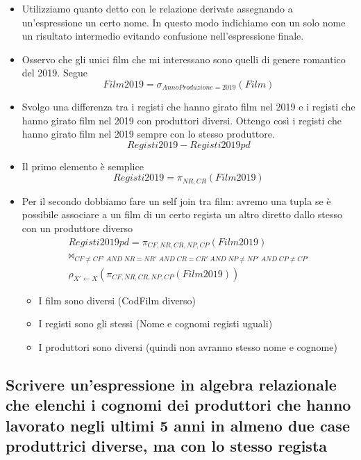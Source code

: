 \begin{itemize}
	\item Utilizziamo quanto detto con le relazione derivate assegnando a un'espressione un certo nome. In questo modo indichiamo con un solo nome un risultato intermedio evitando confusione nell'espressione finale.
	\item Osservo che gli unici film che mi interessano sono quelli di genere romantico del 2019. Segue
	\[Film2019 = \sigma_{AnnoProduzione = 2019}(Film)\]
	\item Svolgo una differenza tra i registi che hanno girato film nel 2019 e i registi che hanno girato film nel 2019 con produttori diversi. Ottengo così i registi che hanno girato film nel 2019 sempre con lo stesso produttore.
	\[Registi2019 - Registi2019pd\]
	\item Il primo elemento è semplice
	\[Registi2019 = \pi_{NR,CR}(Film2019)\]
	\item Per il secondo dobbiamo fare un self join tra film: avremo una tupla se è possibile associare a un film di un certo regista un altro diretto dallo stesso con un produttore diverso
	\begin{align*}Registi2019pd = \pi_{CF,NR,CR,NP,CP}(Film2019)\\ \Join_{CF \neq CF'\;AND\;NR=NR'\;AND\;CR=CR'\;AND\;NP\neq NP'\;AND\;CP\neq CP'} \\\rho_{X' \longleftarrow X}(\pi_{CF,NR,CR,NP,CP}(Film2019))\end{align*}
	\begin{itemize}
		\item I film sono diversi (CodFilm diverso)
		\item I registi sono gli stessi (Nome e cognomi registi uguali)
		\item I produttori sono diversi (quindi non avranno stesso nome e cognome)
	\end{itemize}
\end{itemize}

\subsection*{Scrivere un'espressione in algebra relazionale che elenchi i cognomi dei produttori che hanno lavorato negli ultimi 5 anni in almeno due case produttrici diverse, ma con lo stesso regista}


